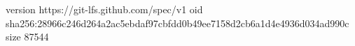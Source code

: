 version https://git-lfs.github.com/spec/v1
oid sha256:28966c246d264a2ac5ebdaf97cbfdd0b49ee7158d2cb6a1d4e4936d034ad990c
size 87544
